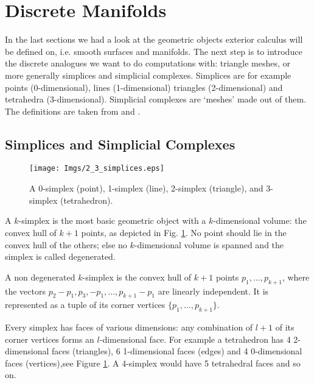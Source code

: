 \newpage
\section{Discrete Manifolds}
\label{sec::2_discreteManifolds}
In the last sections we had a look at the geometric objects exterior calculus will be defined on, i.e. smooth surfaces and manifolds. The next step is to introduce the discrete analogues we want to do computations with: triangle meshes, or more generally simplices and simplicial complexes. Simplices are for example points (0-dimensional), lines (1-dimensional) triangles (2-dimensional) and tetrahedra (3-dimensional). Simplicial complexes are `meshes' made out of them. The definitions are taken from \cite{DMK08} and \cite{FRANKEL11}.

\subsection{Simplices and Simplicial Complexes}

\begin{figure}[t]
\begin{center}
\texttt{[image: Imgs/2\_3\_simplices.eps]}
\end{center}
\caption{A 0-simplex (point), 1-simplex (line), 2-simplex (triangle), and 3-simplex (tetrahedron). }
\label{fig::2_3_simplices}
\end{figure}

A $k$-simplex is the most basic geometric object with a $k$-dimensional volume: the convex hull of $k+1$ points, as depicted in Fig. \ref{fig::2_3_simplices}. No point should lie in the convex hull of the others; else no $k$-dimensional volume is spanned and the simplex is called degenerated.

\begin{definition}[Simplex] A non degenerated $k$-simplex is the convex hull of $k + 1$ points $p_1,...,p_{k+1}$, where the vectors $p_2 -p_1, p_3,-p_1, ..., p_{k+1} -p_1$ are linearly independent. It is represented as a tuple of its corner vertices $\{p_1,...,p_{k+1}\}$.
\end{definition}

Every simplex has faces of various dimensions: any combination of $l+1$ of its corner vertices forms an $l$-dimensional face. For example a tetrahedron has 4 2-dimensional faces (triangles), 6 1-dimensional faces (edges) and 4 0-dimensional faces (vertices),see Figure \ref{fig::2_3_simplices}. A 4-simplex would have 5 tetrahedral faces and so on.

